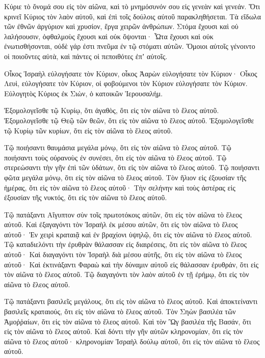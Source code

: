 \begin{spacing}{1.1}
\begin{multicols}{2}
Κύριε τὸ ὄνομά σου εἰς τὸν αἰῶνα, καὶ τὸ μνημόσυνόν σου εἰς γενεὰν καὶ γενεάν.
Ὅτι κρινεῖ Κύριος τὸν λαὸν αὐτοῦ, καὶ ἐπὶ τοῖς δούλοις αὐτοῦ παρακληθήσεται.
Τὰ εἴδωλα τῶν ἐθνῶν ἀργύριον καὶ χρυσίον, ἔργα χειρῶν ἀνθρώπων.
Στόμα ἔχουσι καὶ οὐ λαλήσουσιν, ὀφθαλμοὺς ἔχουσι καὶ οὐκ ὄψονται·
Ὦτα ἔχουσι καὶ οὐκ ἐνωτισθήσονται, οὐδὲ γάρ ἐστι πνεῦμα ἐν τῷ στόματι αὐτῶν.
Ὅμοιοι αὐτοῖς γένοιντο οἱ ποιοῦντες αὐτὰ, καὶ πάντες οἱ πεποιθότες ἐπʼ αὐτοῖς.

Οἶκος Ἰσραὴλ εὐλογήσατε τὸν Κύριον, οἶκος Ἀαρὼν εὐλογήσατε τὸν Κύριον·
Οἶκος Λευὶ, εὐλογήσατε τὸν Κύριον, οἱ φοβούμενοι τὸν Κύριον εὐλογήσατε τὸν Κύριον.
Εὐλογητὸς Κύριος ἐκ Σιὼν, ὁ κατοικῶν Ἱερουσαλήμ.

Ἐξομολογεῖσθε τῷ Κυρίῳ, ὅτι ἀγαθὸς, ὅτι εἰς τὸν αἰῶνα τὸ ἔλεος αὐτοῦ.
Ἐξομολογεῖσθε τῷ Θεῷ τῶν θεῶν, ὅτι εἰς τὸν αἰῶνα τὸ ἔλεος αὐτοῦ.
Ἐξομολογεῖσθε τῷ Κυρίῳ τῶν κυρίων, ὅτι εἰς τὸν αἰῶνα τὸ ἔλεος αὐτοῦ.

Τῷ ποιήσαντι θαυμάσια μεγάλα μόνῳ, ὅτι εἰς τὸν αἰῶνα τὸ ἔλεος αὐτοῦ.
Τῷ ποιήσαντι τοὺς οὐρανοὺς ἐν συνέσει, ὅτι εἰς τὸν αἰῶνα τὸ ἔλεος αὐτοῦ.
Τῷ στερεώσαντι τὴν γῆν ἐπὶ τῶν ὑδάτων, ὅτι εἰς τὸν αἰῶνα τὸ ἔλεος αὐτοῦ.
Τῷ ποιήσαντι φῶτα μεγάλα μόνῳ, ὅτι εἰς τὸν αἰῶνα τὸ ἔλεος αὐτοῦ.
Τὸν ἥλιον εἰς ἐξουσίαν τῆς ἡμέρας, ὅτι εἰς τὸν αἰῶνα τὸ ἔλεος αὐτοῦ·
Τὴν σελήνην καὶ τοὺς ἀστέρας εἰς ἐξουσίαν τῆς νυκτός, ὅτι εἰς τὸν αἰῶνα τὸ ἔλεος αὐτοῦ.

Τῷ πατάξαντι Αἴγυπτον σὺν τοῖς πρωτοτόκοις αὐτῶν, ὅτι εἰς τὸν αἰῶνα τὸ ἔλεος αὐτοῦ.
Καὶ ἐξαγαγόντι τὸν Ἰσραὴλ ἐκ μέσου αὐτῶν, ὅτι εἰς τὸν αἰῶνα τὸ ἔλεος αὐτοῦ·
Ἐν χειρὶ κραταιᾷ καὶ ἐν βραχίονι ὑψηλῷ, ὅτι εἰς τὸν αἰῶνα τὸ ἔλεος αὐτοῦ.
Τῷ καταδιελόντι τὴν ἐρυθρὰν θάλασσαν εἰς διαιρέσεις, ὅτι εἰς τὸν αἰῶνα τὸ ἔλεος αὐτοῦ·
Καὶ διαγαγόντι τὸν Ἰσραὴλ διὰ μέσου αὐτῆς, ὅτι εἰς τὸν αἰῶνα τὸ ἔλεος αὐτοῦ·
Καὶ ἐκτινάξαντι Φαραὼ καὶ τὴν δύναμιν αὐτοῦ εἰς θάλασσαν ἐρυθράν, ὅτι εἰς τὸν αἰῶνα τὸ ἔλεος αὐτοῦ.
Τῷ διαγαγόντι τὸν λαὸν αὐτοῦ ἐν τῇ ἐρήμῳ, ὅτι εἰς τὸν αἰῶνα τὸ ἔλεος αὐτοῦ.

Τῷ πατάξαντι βασιλεῖς μεγάλους, ὅτι εἰς τὸν αἰῶνα τὸ ἔλεος αὐτοῦ.
Καὶ ἀποκτείναντι βασιλεῖς κραταιούς, ὅτι εἰς τὸν αἰῶνα τὸ ἔλεος αὐτοῦ.
Τὸν Σηὼν βασιλέα τῶν Ἀμοῤῥαίων, ὅτι εἰς τὸν αἰῶνα τὸ ἔλεος αὐτοῦ.
Καὶ τὸν Ὢγ βασιλέα τῆς Βασάν, ὅτι εἰς τὸν αἰῶνα τὸ ἔλεος αὐτοῦ.
Καὶ δόντι τὴν γῆν αὐτῶν κληρονομίαν, ὅτι εἰς τὸν αἰῶνα τὸ ἔλεος αὐτοῦ·
κληρονομίαν Ἰσραὴλ δούλῳ αὐτοῦ, ὅτι εἰς τὸν αἰῶνα τὸ ἔλεος αὐτοῦ.


\end{multicols}
\end{spacing}
